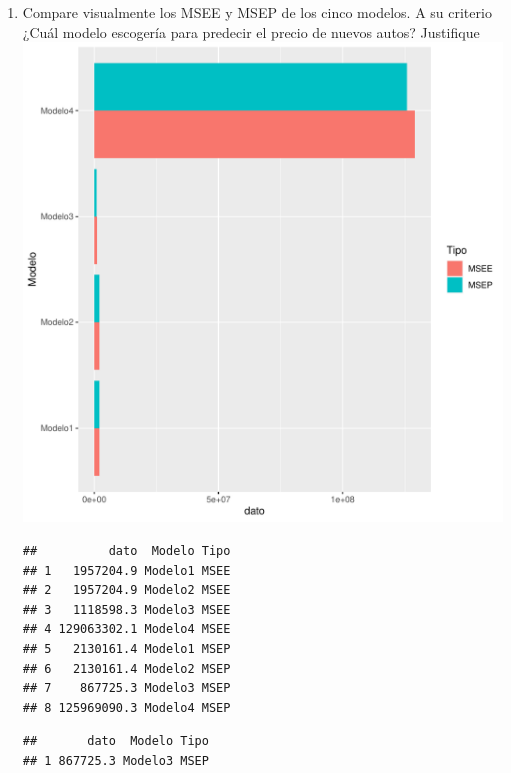 \documentclass[11pt,letterpaper]{article}\usepackage[]{graphicx}\usepackage[]{color}
\makeatletter
\def\maxwidth{ %
  \ifdim\Gin@nat@width>\linewidth
    \linewidth
  \else
    \Gin@nat@width
  \fi
}
\newenvironment{kframe}{%
 \def\at@end@of@kframe{}%
 \ifinner\ifhmode%
  \def\at@end@of@kframe{\end{minipage}}%
  \begin{minipage}{\columnwidth}%
 \fi\fi%
 \def\FrameCommand##1{\hskip\@totalleftmargin \hskip-\fboxsep
 \colorbox{shadecolor}{##1}\hskip-\fboxsep
     \hskip-\linewidth \hskip-\@totalleftmargin \hskip\columnwidth}%
 \MakeFramed {\advance\hsize-\width
   \@totalleftmargin\z@ \linewidth\hsize
   \@setminipage}}%
 {\par\unskip\endMakeFramed%
 \at@end@of@kframe}
\newenvironment{knitrout}{}{} %
\makeatother
\begin{document}
\begin{enumerate}
    \item Compare visualmente los MSEE y MSEP de los cinco modelos. A su criterio ¿Cuál modelo escogería para predecir el precio de nuevos autos? Justifique
\begin{knitrout}
\color{fgcolor}
\includegraphics[width=\maxwidth]{figure/unnamed-chunk-14-1} 
\begin{kframe}\begin{verbatim}
##          dato  Modelo Tipo
## 1   1957204.9 Modelo1 MSEE
## 2   1957204.9 Modelo2 MSEE
## 3   1118598.3 Modelo3 MSEE
## 4 129063302.1 Modelo4 MSEE
## 5   2130161.4 Modelo1 MSEP
## 6   2130161.4 Modelo2 MSEP
## 7    867725.3 Modelo3 MSEP
## 8 125969090.3 Modelo4 MSEP
\end{verbatim}
\end{kframe}
\end{knitrout}
 
\begin{knitrout}
\color{fgcolor}\begin{kframe}
\begin{verbatim}
##       dato  Modelo Tipo
## 1 867725.3 Modelo3 MSEP
\end{verbatim}
\end{kframe}
\end{knitrout}
  

\end{enumerate}
\end{document}
